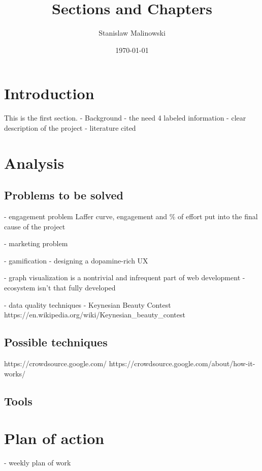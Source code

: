 \documentclass{article}
\title{Sections and Chapters}
\author{Stanislaw Malinowski}
\date{\today}
\begin{document}
\maketitle
\section{Introduction}

This is the first section.
- Background - the need 4 labeled information
- clear description of the project
- literature cited


\blindtext

\section{Analysis}
\subsection*{Problems to be solved}
- engagement problem
Laffer curve, engagement and \% of effort put into the final cause of the project

- marketing problem

- gamification - designing a dopamine-rich UX

- graph visualization is a nontrivial and infrequent part of web development - ecosystem isn't that fully developed

- data quality techniques - Keynesian Beauty Contest
https://en.wikipedia.org/wiki/Keynesian_beauty_contest


\subsection*{Possible techniques}
https://crowdsource.google.com/
https://crowdsource.google.com/about/how-it-works/

\subsection*{Tools}


\section{Plan of action}
- weekly plan of work
\blindtext
\end{document}
